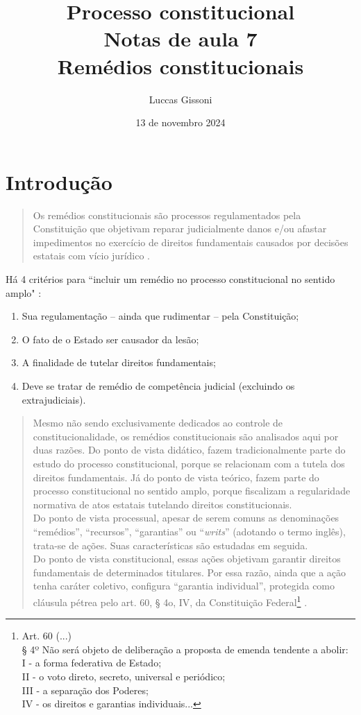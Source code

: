 \documentclass{article}
\title{%
 Processo constitucional \\
  \Large Notas de aula 7 \\
  \large Remédios constitucionais}
\author{Luccas Gissoni}
\date{13 de novembro 2024}
\begin{document}
\maketitle
\tableofcontents

\section{Introdução}

\begin{quote}
    Os remédios constitucionais são processos regulamentados pela Constituição que objetivam reparar judicialmente danos e/ou afastar impedimentos no exercício de direitos fundamentais causados por decisões estatais com vício jurídico \cite[p. 399]{dimoulis_curso_2016}.
\end{quote}

Há 4 critérios para ``incluir um remédio no processo constitucional no sentido amplo" \cite[p. 399]{dimoulis_curso_2016}:

\begin{enumerate}
    \item Sua regulamentação – ainda que rudimentar – pela Constituição;
    \item O fato de o Estado ser causador da lesão;
    \item A finalidade de tutelar direitos fundamentais;
    \item Deve se tratar de remédio de competência judicial (excluindo os extrajudiciais).
\end{enumerate}

\begin{quote}
    Mesmo não sendo exclusivamente dedicados ao controle de constitucionalidade, os remédios constitucionais são analisados aqui por duas razões. Do ponto de vista didático, fazem tradicionalmente parte do estudo do processo constitucional, porque se relacionam com a tutela dos direitos fundamentais. Já do ponto de vista teórico, fazem parte do processo constitucional no sentido amplo, porque fiscalizam a regularidade normativa de atos estatais tutelando direitos constitucionais.\\
    Do ponto de vista processual, apesar de serem comuns as denominações “remédios”, “recursos”, “garantias” ou “\textit{writs}” (adotando o termo inglês), trata-se de ações. Suas características são estudadas em seguida.\\
    Do ponto de vista constitucional, essas ações objetivam garantir direitos fundamentais de determinados titulares. Por essa razão, ainda que a ação tenha caráter coletivo, configura “garantia individual”, protegida como cláusula pétrea pelo art. 60, § 4o, IV, da Constituição Federal\footnote{Art. 60 (...)\\
    § 4º Não será objeto de deliberação a proposta de emenda tendente a abolir:\\
    I - a forma federativa de Estado;\\
    II - o voto direto, secreto, universal e periódico;\\
    III - a separação dos Poderes;\\
    IV - os direitos e garantias individuais...} \cite[p. 399]{dimoulis_curso_2016}.
\end{quote}
\end{document}
